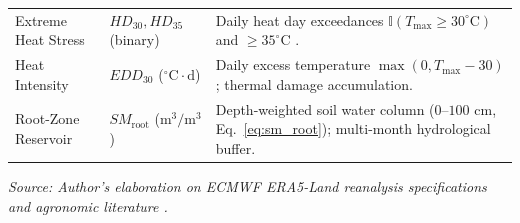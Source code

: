\begin{table}[htbp]
\begin{tabularx}{\textwidth}{p{3.4cm} p{3.2cm} >{\raggedright\arraybackslash}X}
Extreme Heat Stress & $HD_{30}, HD_{35}$ (binary) & Daily heat day exceedances $\mathbb{I}(T_{\text{max}} \ge 30^\circ\text{C})$ and $\ge 35^\circ\text{C}$ \citep{Schlenker2009}. \\
Heat Intensity & $EDD_{30}$ ($^\circ\text{C}\cdot\text{d}$) & Daily excess temperature $\max(0, T_{\text{max}} - 30)$; thermal damage accumulation. \\
Root-Zone Reservoir & $SM_{\text{root}}$ ($\text{m}^3/\text{m}^3$) & Depth-weighted soil water column ($0$--$100\text{ cm}$, Eq.~\eqref{eq:sm_root}); multi-month hydrological buffer. \\
\bottomrule
\end{tabularx}
\vspace{0.2em}
{\footnotesize \textit{Source: Author's elaboration on ECMWF ERA5-Land reanalysis specifications and agronomic literature \citep{Allen1998, Schlenker2009}.}}
\end{table}

